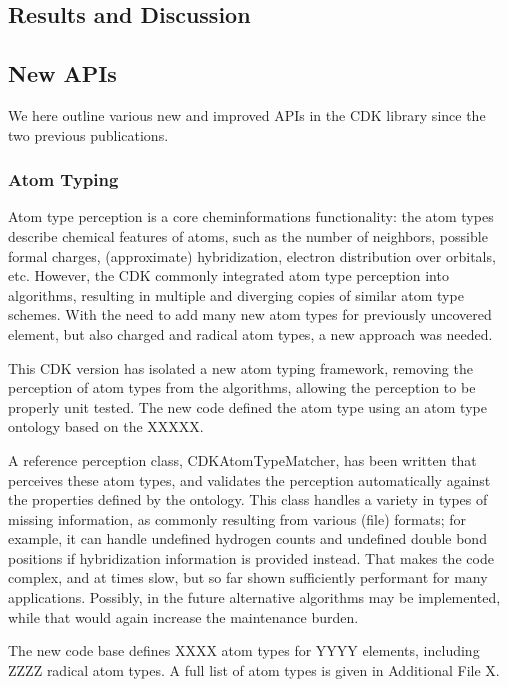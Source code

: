 \documentclass[10pt]{bmc_article}
\newenvironment{bmcformat}{\begin{raggedright}\baselineskip20pt\sloppy\setboolean{publ}{false}}{\end{raggedright}\baselineskip20pt\sloppy}
\begin{document}
\begin{bmcformat}
\section*{Results and Discussion}

\subsection*{New APIs}

We here outline various new and improved APIs in the CDK library since the two previous
publications.

  \subsubsection*{Atom Typing}

  Atom type perception is a core cheminformations functionality: the atom types describe
  chemical features of atoms, such as the number of neighbors, possible formal charges,
  (approximate) hybridization, electron distribution over orbitals, etc. However, the
  CDK commonly integrated atom type perception into algorithms, resulting in multiple
  and diverging copies of similar atom type schemes. With the need to add many
  new atom types for previously uncovered element, but also charged and radical atom
  types, a new approach was needed.
  
  This CDK version has isolated a new atom typing framework, removing the perception of
  atom types from the algorithms, allowing the perception to be properly unit tested.
  The new code defined the atom type using an atom type ontology based on the XXXXX.
  
  A reference perception class, CDKAtomTypeMatcher, has been written that perceives these atom types, and
  validates the perception automatically against the properties defined by the ontology.
  This class handles a variety in types of missing information, as commonly resulting
  from various (file) formats; for example, it can handle undefined hydrogen counts
  and undefined double bond positions if hybridization information is provided instead.
  That makes the code complex, and at times slow, but so far shown sufficiently
  performant for many applications. Possibly, in the future
  alternative algorithms may be implemented, while that would again increase the maintenance
  burden.

  The new code base defines XXXX atom types for YYYY elements, including ZZZZ radical
  atom types. A full list of atom types is given in Additional File X.
  

\end{bmcformat}
\end{document}
